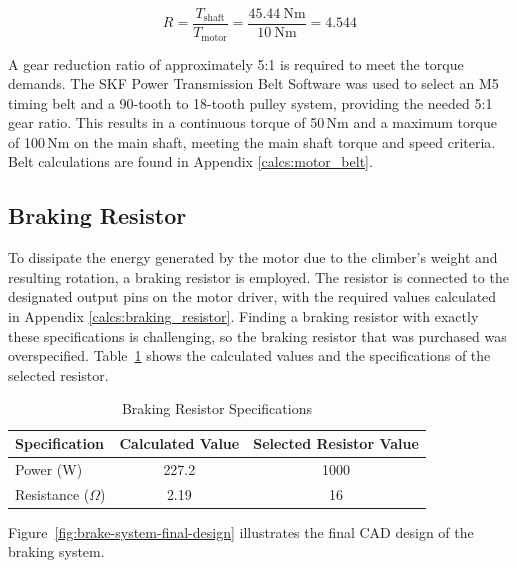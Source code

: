 \[
R = \frac{T_{\text{shaft}}}{T_{\text{motor}}} = \frac{45.44\ \text{Nm}}{10\ \text{Nm}} = 4.544
\]

A gear reduction ratio of approximately 5:1 is required to meet the torque demands. The SKF Power Transmission Belt Software \cite{SKF_BeltDriveTool} was used to select an M5 timing belt and a 90-tooth to 18-tooth pulley system, providing the needed 5:1 gear ratio. This results in a continuous torque of 50\,Nm and a maximum torque of 100\,Nm on the main shaft, meeting the main shaft torque and speed criteria. Belt calculations are found in Appendix \ref{calcs:motor_belt}.

\subsection{Braking Resistor}

To dissipate the energy generated by the motor due to the climber's weight and resulting rotation, a braking resistor is employed. The resistor is connected to the designated output pins on the motor driver, with the required values calculated in Appendix \ref{calcs:braking_resistor}. Finding a braking resistor with exactly these specifications is challenging, so the braking resistor that was purchased was overspecified. Table~\ref{tab:braking-resistor-specs} shows the calculated values and the specifications of the selected resistor.

\begin{table}[H]
    \centering
    \begin{tabular}{|l|c|c|}
        \hline
        \textbf{Specification} & \textbf{Calculated Value} & \textbf{Selected Resistor Value} \\
        \hline
        Power (W) & 227.2 & 1000 \\
        \hline
        Resistance ($\Omega$) & 2.19 & 16 \\
        \hline
    \end{tabular}
    \caption{Braking Resistor Specifications}
    \label{tab:braking-resistor-specs}
\end{table}

Figure~\ref{fig:brake-system-final-design} illustrates the final CAD design of the braking system.

